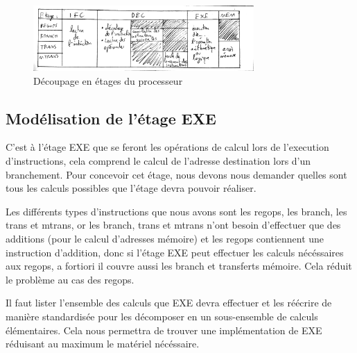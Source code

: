 \documentclass{article}
\begin{document}
\begin{figure}[H]
\includegraphics[width=0.75\textwidth]{pics/etages.png}
\centering
\caption{Découpage en étages du processeur}
\label{etages}
\end{figure}

\subsection{Modélisation de l'étage EXE}

\par
C'est à l'étage EXE que se feront les opérations de calcul lors de l'execution d'instructions,
cela comprend le calcul de l'adresse destination lors d'un branchement.
Pour concevoir cet étage, nous devons nous demander quelles sont tous les calculs possibles
que l'étage devra pouvoir réaliser.

\par
Les différents types d'instructions que nous avons sont les regops, les branch, les trans et mtrans,
or les branch, trans et mtrans n'ont besoin d'effectuer que des additions (pour le calcul d'adresses
mémoire) et les regops contiennent une instruction d'addition, donc si l'étage EXE peut effectuer
les calculs nécéssaires aux regops, a fortiori il couvre aussi les branch et transferts mémoire.
Cela réduit le problème au cas des regops.

\par
Il faut lister l'ensemble des calculs que EXE devra effectuer et les réécrire
de manière standardisée pour les décomposer en un sous-ensemble de calculs élémentaires.
Cela nous permettra de trouver une implémentation de EXE réduisant au maximum le matériel nécéssaire.
\end{document}
